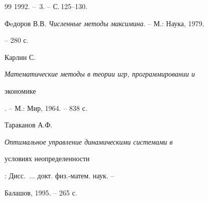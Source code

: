 \begin{thebibliography}{99}
1992. -- \No\,3. -- С.\,125--130. 




Фeдоров В.В. {\em Численные методы максимина}. -- М.: Наука, 1979. 


-- 280 с. 




Карлин С. {\em Математические методы в теории игр, программировании и 


экономике}. -- М.: Мир, 1964. -- 838 с. 




Тараканов А.Ф. {\em Оптимальное управление динамическими системами в 


условиях неопределенности}: Дисс.~$\dotsc$ докт. физ.-матем. наук. -- 


Балашов, 1995. -- 265 с. 





\end{thebibliography} 


 


\vskip 2cm 


 








 


\label{end} 


 


